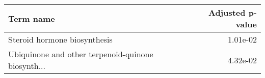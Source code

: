\begin{tabular}{lr}
\toprule
                                         Term name &  Adjusted p-value \\
\midrule
                      Steroid hormone biosynthesis &          1.01e-02 \\
Ubiquinone and other terpenoid-quinone biosynth... &          4.32e-02 \\
\bottomrule
\end{tabular}

